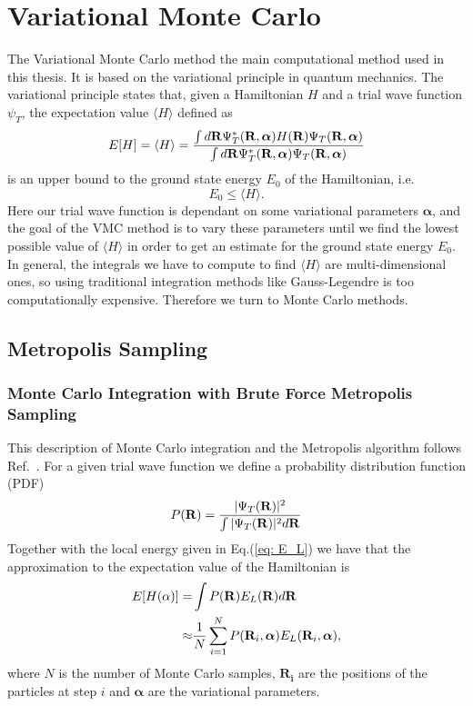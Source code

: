 \documentclass[../main.tex]{subfiles}
\begin{document}
\chapter{Variational Monte Carlo}

The Variational Monte Carlo method the main computational method used in this thesis. It is based on the variational principle in quantum mechanics. The variational principle states that, given a Hamiltonian $H$ and a trial wave function $\psi_T$, the expectation value $\langle H \rangle$ defined as\cite{Griffiths}
\begin{equation}
 E[H] = \langle H \rangle =
 \frac{\int d {\bf R} \Psi_T^*({\bf R}, \boldsymbol{\alpha}) H({\bf R}) \Psi_T({\bf R}, \boldsymbol{\alpha})}
       {\int d {\bf R} \Psi_T^*({\bf R}, \boldsymbol{\alpha}) \Psi_T({\bf R}, \boldsymbol{\alpha})}
 \label{multidim}
\end{equation}
is an upper bound to the ground state energy $E_0$ of the Hamiltonian, i.e.
\begin{equation}
E_0 \leq \langle H \rangle.
\end{equation}
Here our trial wave function is dependant on some variational parameters $\boldsymbol{\alpha}$, and the goal of the VMC method is to vary these parameters until we find the lowest possible value of $\langle H\rangle$ in order to get an estimate for the ground state energy $E_0$. In general, the integrals we have to compute to find $\langle H\rangle$ are multi-dimensional ones, so using traditional integration methods like Gauss-Legendre is too computationally expensive. Therefore we turn to Monte Carlo methods.

\section{Metropolis Sampling}

\subsection{Monte Carlo Integration with Brute Force Metropolis Sampling}
This description of Monte Carlo integration and the Metropolis algorithm follows Ref.~\cite{FYS4411-Slides}.
For a given trial wave function we define a probability distribution function (PDF)
\begin{equation}
 P({\bf R}) = \frac{|\Psi_T({\bf R})|^2}{\int |\Psi_T({\bf R})|^2 d{\bf R}}
\end{equation}
Together with the local energy given in Eq.(\ref{eq: E_L}) we have that the approximation to the expectation value of the Hamiltonian is
\begin{align}
\begin{split}
E[H(\mathbf{\alpha})] =& \int P({\bf R}) E_L({\bf R}) d{\bf R}\\
\approx& \frac{1}{N} \sum_{i=1}^N P({\bf R}_i, \boldsymbol{\alpha}) E_L({\bf R}_i, \boldsymbol{\alpha}),
\end{split}
\end{align}
where $N$ is the number of Monte Carlo samples, $\mathbf{R_i}$ are the positions of the particles at step $i$ and $\boldsymbol{\alpha}$ are the variational parameters.
\end{document}
